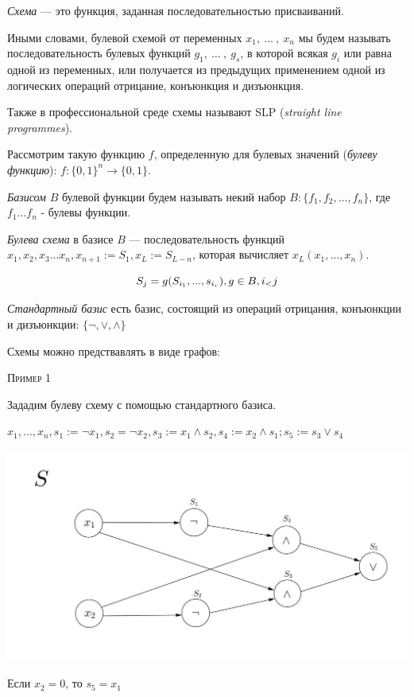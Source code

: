 \documentclass[a4paper, 12pt]{article}
\begin{document}
\textit{Схема} --- это функция, заданная последовательностью присваиваний.

Иными словами, булевой схемой от переменных $x_1,\ \ldots\ ,\ x_n$ мы будем называть последовательность
булевых функций $g_1,\ \ldots\ ,\ g_s$, в которой всякая $g_i$ или равна одной из переменных, или
получается из предыдущих применением одной из логических операций отрицание,
конъюнкция и дизъюнкция.

Также в профессиональной среде схемы называют SLP (\textit{straight line programmes}). 

Рассмотрим такую функцию $f$, определенную для булевых значений (\textit{булеву функцию}): $f:\{0, 1\}^n \rightarrow \{0, 1\}$.

\textit{Базисом} $B$ булевой функции будем называть некий набор $B:\{f_1, f_2, \ldots , f_n\}$, где $f_1 \ldots f_n$ - булевы функции.

\textit{Булева схема} в базисе $B$  --- последовательность функций $x_1, x_2, x_3... x_n, x_{n+1} := S_1, x_L := S_{L-n}$, которая вычисляет $x_L(x_1, \ldots ,x_n)$. 

\[S_j = g(S_{i_1},  ... , s_{i_r}), g \in B, i_\mathalpha < j\]

\textit{Стандартный базис} есть базис, состоящий из операций отрицания, конъюнкции и дизъюнкции: $\{\lnot, \vee, \wedge\}$

Схемы можно предствавлять в виде графов:

\textsc{Пример 1}

Зададим булеву схему с помощью стандартного базиса.

$x_1, \ldots ,x_n, s_1 := \lnot x_1, s_2 = \lnot x_2, s_3 := x_1 \wedge s_2, s_4 := x_2 \wedge s_1; s_5 := s_3 \vee s_4$

\includegraphics[height=7cm]{images/1.png}
 
 Если $x_2 = 0$, то $s_5 = x_1$
  
\end{document}
